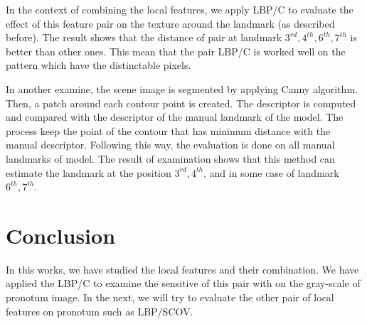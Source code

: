 In the context of combining the local features, we apply LBP/C to evaluate the effect of this feature pair on the texture around the landmark (as described before). The result shows that the distance of pair at landmark $3^{rd}, 4^{th}, 6^{th}, 7^{th}$ is better than other ones. This mean that the pair LBP/C is worked well on the pattern which have the distinctable pixels.

In another examine, the scene image is segmented by applying Canny algorithm. Then, a patch around each contour point is created. The descriptor is computed and compared with the descriptor of the manual landmark of the model. The process keep the point of the contour that has minimum distance with the manual descriptor. Following this way, the evaluation is done on all manual landmarks of model. The result of examination shows that this method can estimate the landmark at the position $3^{rd}, 4^{th}$, and in some case of landmark $6^{th}, 7^{th}$.
\section{Conclusion}
In this works, we have studied the local features and their combination. We have applied the LBP/C to examine the sensitive of this pair with on the gray-scale of pronotum image. In the next, we will try to evaluate the other pair of local features on pronotum such as LBP/SCOV.
%
%